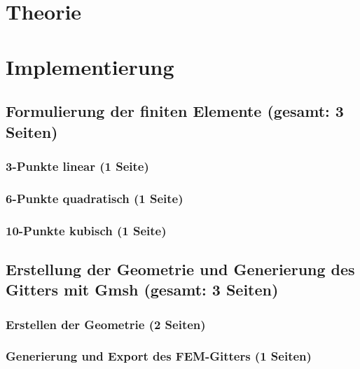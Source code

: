 \documentclass[12pt,a4paper]{scrartcl}
\begin{document}




%


\section{Theorie}








\section{Implementierung}


\subsection{Formulierung der finiten Elemente (gesamt: 3 Seiten)}
\subsubsection{3-Punkte linear (1 Seite)}
\subsubsection{6-Punkte quadratisch (1 Seite)}
\subsubsection{10-Punkte kubisch (1 Seite)}

\subsection{Erstellung der Geometrie und Generierung des Gitters mit Gmsh (gesamt: 3 Seiten)}
\subsubsection{Erstellen der Geometrie (2 Seiten)}
\subsubsection{Generierung und Export des FEM-Gitters (1 Seiten)}
\end{document}
